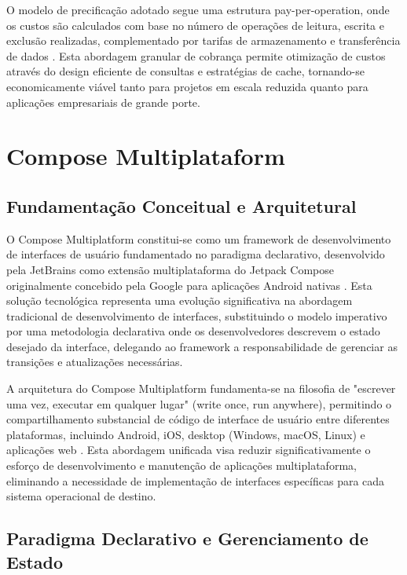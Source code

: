 \documentclass[
	12pt,				    %
	openright,			    %
	oneside,			    %
	a4paper,			    %
    sumario=tradicional,    %
	english,			    %
	brazil,				    %
	]{abntex2}              %
\begin{document}
O modelo de precificação adotado segue uma estrutura pay-per-operation, onde os custos são calculados com base no número de operações de leitura, escrita e exclusão realizadas, complementado por tarifas de armazenamento e transferência de dados \cite{firebase2023pricing}. Esta abordagem granular de cobrança permite otimização de custos através do design eficiente de consultas e estratégias de cache, tornando-se economicamente viável tanto para projetos em escala reduzida quanto para aplicações empresariais de grande porte.


\section{Compose Multiplataform}
\subsection{Fundamentação Conceitual e Arquitetural}

O Compose Multiplatform constitui-se como um framework de desenvolvimento de interfaces de usuário fundamentado no paradigma declarativo, desenvolvido pela JetBrains como extensão multiplataforma do Jetpack Compose originalmente concebido pela Google para aplicações Android nativas \cite{jetbrains2023compose}. Esta solução tecnológica representa uma evolução significativa na abordagem tradicional de desenvolvimento de interfaces, substituindo o modelo imperativo por uma metodologia declarativa onde os desenvolvedores descrevem o estado desejado da interface, delegando ao framework a responsabilidade de gerenciar as transições e atualizações necessárias.

A arquitetura do Compose Multiplatform fundamenta-se na filosofia de "escrever uma vez, executar em qualquer lugar" (write once, run anywhere), permitindo o compartilhamento substancial de código de interface de usuário entre diferentes plataformas, incluindo Android, iOS, desktop (Windows, macOS, Linux) e aplicações web \cite{kotlin2023multiplatform}. Esta abordagem unificada visa reduzir significativamente o esforço de desenvolvimento e manutenção de aplicações multiplataforma, eliminando a necessidade de implementação de interfaces específicas para cada sistema operacional de destino.

\subsection{Paradigma Declarativo e Gerenciamento de Estado}
\end{document}
